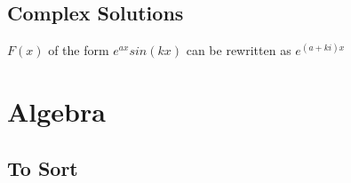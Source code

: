 \subsection{Complex Solutions}

\(F(x)\) of the form \(e^{ax}sin(kx)\) can be rewritten as
\(e^{(a+ki)x}\)

\hypertarget{algebra}{%
\section{Algebra}\label{algebra}}


\hypertarget{to-sort}{%
\subsection{To Sort}\label{to-sort}}

